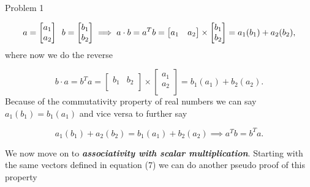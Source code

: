 \begin{problem}{Problem 1}
\begin{highlight}
        \begin{equation}
            a = 
            \begin{bmatrix}
                a_{1} \\
                a_{2} \\
            \end{bmatrix}
            \hspace*{5pt}
            b = 
            \begin{bmatrix}
                b_{1} \\
                b_{2} \\
            \end{bmatrix}
            \implies
            a \cdot b = a^{T}b =
            \begin{bmatrix}
                a_{1} & a_{2} \\
            \end{bmatrix}
            \times
            \begin{bmatrix}
                b_{1} \\
                b_{2} \\
            \end{bmatrix}
            = a_{1}(b_{1}) + a_{2}(b_{2}),
        \end{equation}
        where now we do the reverse

        \begin{equation}
            b \cdot a = b^{T}a =
            \begin{bmatrix}
                b_{1} & b_{2} \\
            \end{bmatrix}
            \times
            \begin{bmatrix}
                a_{1} \\
                a_{2} \\
            \end{bmatrix}
            = b_{1}(a_{1}) + b_{2}(a_{2}).
        \end{equation}
        Because of the commutativity property of real numbers we can say $a_{1}(b_{1}) = b_{1}(a_{1})$ and vice versa to further say
        
        \begin{equation}
            a_{1}(b_{1}) + a_{2}(b_{2}) = b_{1}(a_{1}) + b_{2}(a_{2})
            \implies
            a^{T}b = b^{T}a.
        \end{equation}

        We now move on to \textbf{\textit{associativity with scalar multiplication}}. Starting with the same vectors defined in equation (7) we can do another pseudo proof of this property


\end{highlight}
\end{problem}
